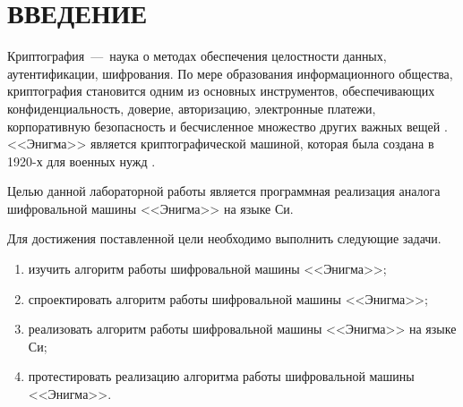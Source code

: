 \chapter*{ВВЕДЕНИЕ}

Криптография~---~наука о методах обеспечения целостности данных, аутентификации, шифрования. По мере образования информационного общества, криптография становится одним из основных инструментов, обеспечивающих конфиденциальность, доверие, авторизацию, электронные платежи, корпоративную безопасность и бесчисленное множество других важных вещей \cite{bib1}. <<Энигма>> является криптографической машиной, которая была создана в 1920-х для военных нужд \cite{bib2}.

Целью данной лабораторной работы является программная реализация аналога шифровальной машины <<Энигма>> на языке Си.

Для достижения поставленной цели необходимо выполнить следующие задачи.

\begin{enumerate}[label=\arabic*)]
	\item изучить алгоритм работы шифровальной машины <<Энигма>>;
	\item спроектировать алгоритм работы шифровальной машины <<Энигма>>;
	\item реализовать алгоритм работы шифровальной машины <<Энигма>> на языке Си;
	\item протестировать реализацию алгоритма работы шифровальной машины  <<Энигма>>.
\end{enumerate}